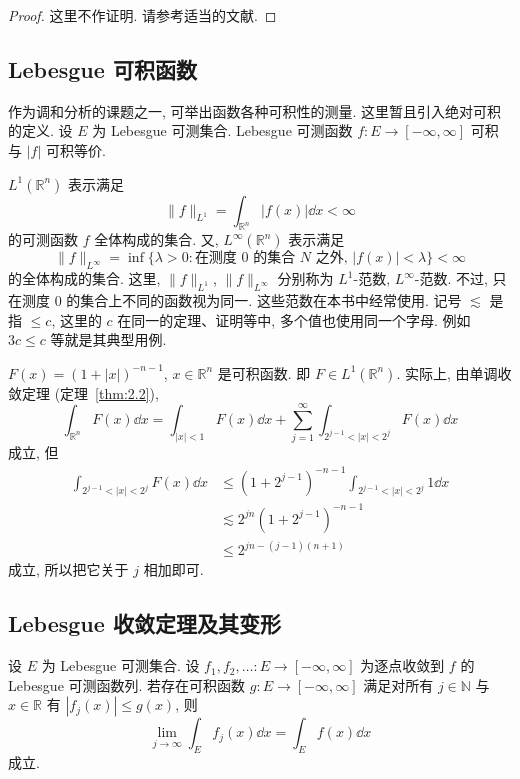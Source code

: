 \begin{proof}
这里不作证明. 请参考适当的文献.
\end{proof}

\subsection*{Lebesgue 可积函数}

作为调和分析的课题之一, 可举出函数各种可积性的测量. 这里暂且引入绝对可积的定义. 设 $E$ 为 Lebesgue 可测集合. Lebesgue 可测函数 $f: E \to [-\infty, \infty]$ 可积与 $|f|$ 可积等价.

$L^{1}(\mathbb{R}^{n})$ 表示满足
\[
\|f\|_{L^{1}} = \int_{\mathbb{R}^{n}}|f(x)|\dd x < \infty
\]
的可测函数 $f$ 全体构成的集合. 又, $L^{\infty}(\mathbb{R}^{n})$ 表示满足
\[
\|f\|_{L^{\infty}} = \inf\{\lambda > 0 : \text{在测度 } 0 \text{ 的集合 } N \text{ 之外, } |f(x)| < \lambda\} < \infty
\]
的全体构成的集合. 这里, $\|f\|_{L^{1}}$, $\|f\|_{L^{\infty}}$ 分别称为 $L^{1}$-范数, $L^{\infty}$-范数. 不过, 只在测度 $0$ 的集合上不同的函数视为同一. 这些范数在本书中经常使用. 记号 $\lesssim$ 是指 $\leq c$, 这里的 $c$ 在同一的定理、证明等中, 多个值也使用同一个字母. 例如 $3c \leq c$ 等就是其典型用例.

\begin{example}\label{exa:2.1}
$F(x) = (1 + |x|)^{-n-1}$, $x \in \mathbb{R}^{n}$ 是可积函数. 即 $F \in L^{1}(\mathbb{R}^{n})$. 实际上, 由单调收敛定理 (定理~\ref{thm:2.2}),
\[
\int_{\mathbb{R}^{n}}F(x)\dd x = \int_{|x| < 1}F(x)\dd x + \sum_{j=1}^{\infty}\int_{2^{j-1} < |x| < 2^{j}}F(x)\dd x
\]
成立, 但
\begin{align*}
\int_{2^{j-1} < |x| < 2^{j}}F(x)\dd x &\leq (1 + 2^{j-1})^{-n-1}\int_{2^{j-1} < |x| < 2^{j}}1\dd x \\
&\lesssim 2^{jn}(1 + 2^{j-1})^{-n-1} \\
&\leq 2^{jn-(j-1)(n+1)}
\end{align*}
成立, 所以把它关于 $j$ 相加即可.
\end{example}

\subsection*{Lebesgue 收敛定理及其变形}

\begin{theorem}\label{thm:2.5}
设 $E$ 为 Lebesgue 可测集合. 设 $f_{1}, f_{2}, \ldots: E \to [-\infty, \infty]$ 为逐点收敛到 $f$ 的 Lebesgue 可测函数列. 若存在可积函数 $g: E \to [-\infty, \infty]$ 满足对所有 $j \in \mathbb{N}$ 与 $x \in \mathbb{R}$ 有 $|f_{j}(x)| \leq g(x)$, 则
\begin{equation}\tag{2.4}
\lim_{j \to \infty}\int_{E}f_{j}(x)\dd x = \int_{E}f(x)\dd x
\label{eq:2.4}
\end{equation}
成立.
\end{theorem}

